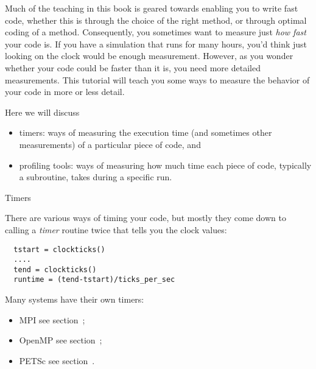 
Much of the teaching in this book is geared towards enabling you to
write fast code, whether this is through the choice of the right
method, or through optimal coding of a method. Consequently, you
sometimes want to measure just \emph{how fast} your code is. If you
have a simulation that runs for many hours, you'd think just looking
on the clock would be enough measurement. However, as you wonder
whether your code could be faster than it is, you need more detailed
measurements. This tutorial will teach you some ways to measure the
behavior of your code in more or less detail.

Here we will discuss 
\begin{itemize}
\item timers: ways of measuring the execution time (and sometimes
  other measurements) of a particular piece of code, and
\item profiling tools: ways of measuring how much time each piece of
  code, typically a subroutine, takes during a specific run.
\end{itemize}

 {Timers}
\label{sec:perf-timers}

There are various ways of timing your code, but mostly they come down
to calling a \emph{timer} routine twice that tells you the clock values:
\begin{verbatim}
  tstart = clockticks()
  ....
  tend = clockticks()
  runtime = (tend-tstart)/ticks_per_sec
\end{verbatim}

Many systems have their own timers:
\begin{itemize}
\item MPI see section~;
\item OpenMP see section~;
\item PETSc see section~.
\end{itemize}

